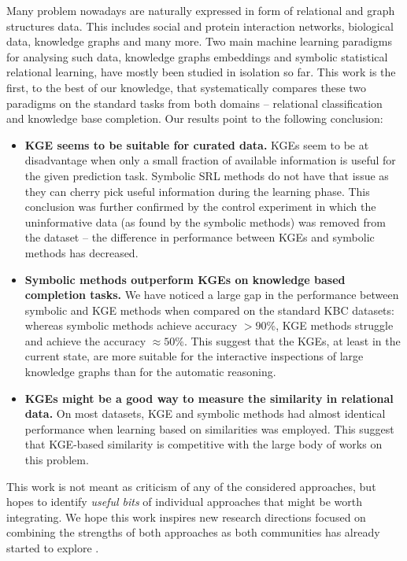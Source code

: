 Many problem nowadays are naturally expressed in form of relational and graph structures data.
This includes social and protein interaction networks, biological data, knowledge graphs and many more.
Two main machine learning paradigms for analysing such data, knowledge graphs embeddings and  symbolic statistical relational learning, have mostly been studied in isolation so far.
This work is the first, to the best of our knowledge, that systematically compares these two paradigms on the standard tasks from both domains -- relational classification and knowledge base completion.
Our results point to the following conclusion:
\begin{itemize}
	\item \textbf{KGE seems to be suitable for curated data.}  KGEs seem to be at disadvantage when only a small fraction of available information is useful for the given prediction task. Symbolic SRL methods do not have that issue as they can cherry pick useful information during the learning phase. This conclusion was further confirmed by the control experiment in which the uninformative data (as found by the symbolic methods) was removed from the dataset -- the difference in performance between KGEs and symbolic methods has decreased.
	\item  \textbf{Symbolic methods outperform KGEs on knowledge based completion tasks.} We have noticed a large gap in the performance between symbolic and KGE methods when compared on the standard KBC datasets: whereas symbolic methods achieve accuracy $> 90$\%, KGE methods struggle and achieve the accuracy $\approx 50$\%. This suggest that the KGEs, at least in the current state, are more suitable for the interactive inspections of large knowledge graphs than for the automatic reasoning.
	\item \textbf{KGEs might be a good way to measure the similarity in relational data.} On most datasets, KGE and symbolic methods had almost identical performance when learning based on similarities was employed. This suggest that KGE-based similarity is competitive with the large body of works on this problem.
\end{itemize} 

This work is not meant as criticism of any of the considered approaches, but hopes to identify \textit{useful bits} of individual approaches that might be worth integrating.
We hope this work inspires new research directions focused on combining the strengths of both approaches as both communities has already started to explore \cite{DBLP:conf/uai/MinerviniDRR17,demeester2016lifted,Schlichtkrull2017ModelingRD}.











